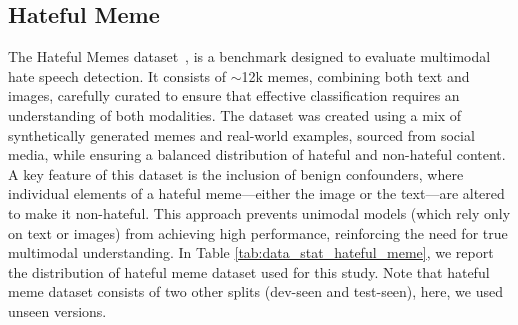 \subsection{Hateful Meme}
The Hateful Memes dataset~\cite{kiela2020hateful}, is a benchmark designed to evaluate multimodal hate speech detection. It consists of $\sim$12k memes, combining both text and images, carefully curated to ensure that effective classification requires an understanding of both modalities. The dataset was created using a mix of synthetically generated memes and real-world examples, sourced from social media, while ensuring a balanced distribution of hateful and non-hateful content. A key feature of this dataset is the inclusion of benign confounders, where individual elements of a hateful meme—either the image or the text—are altered to make it non-hateful. This approach prevents unimodal models (which rely only on text or images) from achieving high performance, reinforcing the need for true multimodal understanding. In Table \ref{tab:data_stat_hateful_meme}, we report the distribution of hateful meme dataset used for this study. Note that hateful meme dataset consists of two other splits (dev-seen and test-seen), here, we used unseen versions. 



\begin{table}[h]
\centering
\setlength{\tabcolsep}{3pt} 
\vspace{-0.2cm}
\caption{Distribution of hateful meme dataset.}
\label{tab:data_stat_hateful_meme}
\vspace{-0.3cm}
\end{table}
